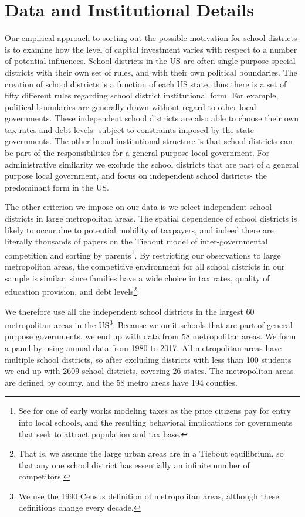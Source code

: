 \section{Data and Institutional Details}

Our empirical approach to sorting out the possible motivation for school districts is to examine how the level of capital investment varies with respect to a number of potential influences. School districts in the US are often single purpose special districts with their own set of rules, and with their own political boundaries. The creation of school districts is a function of each US state, thus there is a set of fifty different rules regarding school district institutional form. For example, political boundaries are generally drawn without regard to other local governments. These independent school districts are also able to choose their own tax rates and debt levels- subject to constraints imposed by the state governments. The other broad institutional structure is that school districts can be part of the responsibilities for a general purpose local government. For administrative similarity we exclude the school districts that are part of a general purpose local government, and focus on independent school districts- the predominant form in the US.

The other criterion we impose on our data is we select independent school districts in large metropolitan areas. The spatial dependence of school districts is likely to occur due to potential mobility of taxpayers, and indeed there are literally thousands of papers on the Tiebout model of inter-governmental competition and sorting by parents\footnote{See \cite{inman_testing_1978} for one of early works modeling taxes as the price citizens pay for entry into local schools, and the resulting behavioral implications for governments that seek to attract population and tax base.}. By restricting our observations to large metropolitan areas, the competitive environment for all school districts in our sample is similar, since families have a wide choice in tax rates, quality of education provision, and debt levels\footnote{That is, we assume the large urban areas are in a Tiebout equilibrium, so that any one school district has essentially an infinite number of competitors.}. 

We therefore use all the independent school districts in the largest 60 metropolitan areas in the US\footnote{We use the 1990 Census definition of metropolitan areas, although these definitions change every decade.}. Because we omit schools that are part of general purpose governments, we end up with data from 58 metropolitan areas. We form a panel by using annual data from 1980 to 2017. All metropolitan areas have multiple school districts, so after excluding districts with less than 100 students we end up with 2609 school districts, covering 26 states. The metropolitan areas are defined by county, and the 58 metro areas have 194 counties. 

